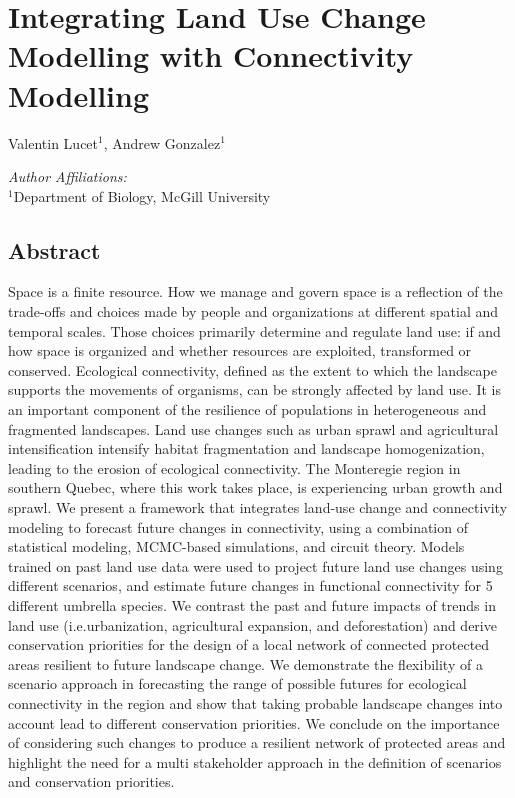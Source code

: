\chapter{Integrating Land Use Change Modelling with Connectivity Modelling}
\begin{center}
{Valentin Lucet$^{1}$, Andrew Gonzalez$^{1}$}\\
\end{center}
\textit{Author Affiliations:}\\
\normalsize{$^{1}$Department of Biology, McGill University}\\
\section{Abstract}

Space is a finite resource. How we manage and govern space is a reflection of the trade-offs and choices made by people and organizations at different spatial and temporal scales. Those choices primarily determine and regulate land use: if and how space is organized and whether resources are exploited, transformed or conserved. Ecological connectivity, defined as the extent to which the landscape supports the movements of organisms, can be strongly affected by land use. It is an important component of the resilience of populations in heterogeneous and fragmented landscapes. Land use changes such as urban sprawl and agricultural intensification intensify habitat fragmentation and landscape homogenization, leading to the erosion of ecological connectivity. The Monteregie region in southern Quebec, where this work takes place, is experiencing urban growth and sprawl. We present a framework that integrates land-use change and connectivity modeling to forecast future changes in connectivity, using a combination of statistical modeling, MCMC-based simulations, and circuit theory. Models trained on past land use data were used to project future land use changes using different scenarios, and estimate future changes in functional connectivity for 5 different umbrella species. We contrast the past and future impacts of trends in land use (i.e.urbanization, agricultural expansion, and deforestation) and derive conservation priorities for the design of a local network of connected protected areas resilient to future landscape change. We demonstrate the flexibility of a scenario approach in forecasting the range of possible futures for ecological connectivity in the region and show that taking probable landscape changes into account lead to different conservation priorities. We conclude on the importance of considering such changes to produce a resilient network of protected areas and highlight the need for a multi stakeholder approach in the definition of scenarios and conservation priorities.\\

